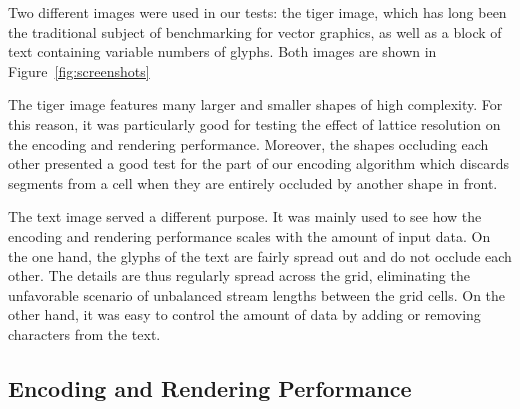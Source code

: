 \documentclass[11pt,a4paper,twoside]{article}
\begin{document}
Two different images were used in our tests: the tiger image, which has long been the traditional subject of benchmarking for vector graphics, as well as a block of text containing variable numbers of glyphs. Both images are shown in Figure~\ref{fig:screenshots}

The tiger image features many larger and smaller shapes of high complexity. For this reason, it was particularly good for testing the effect of lattice resolution on the encoding and rendering performance. Moreover, the shapes occluding each other presented a good test for the part of our encoding algorithm which discards segments from a cell when they are entirely occluded by another shape in front.

The text image served a different purpose. It was mainly used to see how the encoding and rendering performance scales with the amount of input data. On the one hand, the glyphs of the text are fairly spread out and do not occlude each other. The details are thus regularly spread across the grid, eliminating the unfavorable scenario of unbalanced stream lengths between the grid cells. On the other hand, it was easy to control the amount of data by adding or removing characters from the text.


\subsection {Encoding and Rendering Performance}
\end{document}
